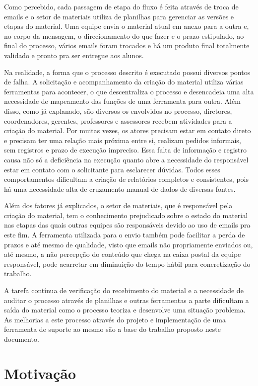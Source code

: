 Como percebido, cada passagem de etapa do fluxo é feita através de troca de emails e o setor de materiais utiliza de planilhas para gerenciar as versões e etapas do material. Uma equipe envia o material atual em anexo para a outra e, no corpo da mensagem, o direcionamento do que fazer e o prazo estipulado, ao final do processo, vários emails foram trocados e há um produto final totalmente validado e pronto pra ser entregue aos alunos.

Na realidade, a forma que o processo descrito é executado possui diversos pontos de falha. A solicitação e acompanhamento da criação do material utiliza várias ferramentas para acontecer, o que descentraliza o processo e desencadeia uma alta necessidade de mapeamento das funções de uma ferramenta para outra. Além disso, como já explanado, são diversos os envolvidos no processo, diretores, coordenadores, gerentes, professores e assessores recebem atividades para a criação do material. Por muitas vezes, os atores precisam estar em contato direto e precisam ter uma relação mais próxima entre si, realizam pedidos informais, sem registros e prazo de execução impreciso. Essa falta de informação e registro causa não só a deficiência na execução quanto abre a necessidade do responsável estar em contato com o solicitante para esclarecer dúvidas. Todos esses comportamentos dificultam a criação de relatórios completos e consistentes, pois há uma necessidade alta de cruzamento manual de dados de diversas fontes.

Além dos fatores já explicados, o setor de materiais, que é responsável pela criação do material, tem o conhecimento prejudicado sobre o estado do material nas etapas das quais outras equipes são responsáveis devido ao uso de emails pra este fim. A ferramenta utilizada para o envio também pode facilitar a perda de prazos e até mesmo de qualidade, visto que emails não propriamente enviados ou, até mesmo, a não percepção do conteúdo que chega na caixa postal da equipe responsável, pode acarretar em diminuição do tempo hábil para concretização do trabalho.

A tarefa contínua de verificação do recebimento do material e a necessidade de auditar o processo através de planilhas e outras ferramentas a parte dificultam a saída do material como o processo teoriza e desenvolve uma situação problema. As melhorias a este processo através do projeto e implementação de uma ferramenta de suporte ao mesmo são a base do trabalho proposto neste documento.

\section{Motivação}

